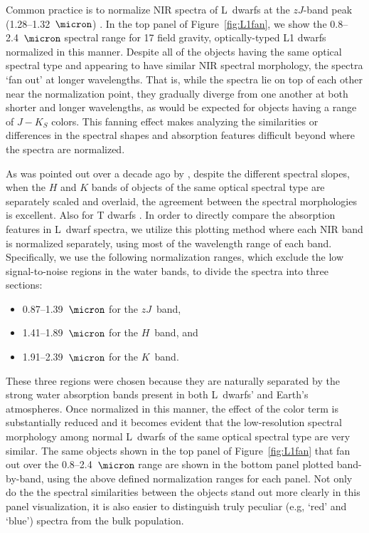 \documentclass[12pt]{aastex6}
\begin{document}
Common practice is to normalize NIR spectra of L~dwarfs at the $zJ$-band peak (1.28--1.32~$\micron$) \citep[e.g.,][]{Kirkpatrick10}.
In the top panel of Figure~\ref{fig:L1fan}, we show the 0.8--2.4~$\micron$ spectral range for 17 field gravity, optically-typed L1 dwarfs normalized in this manner.
Despite all of the objects having the same optical spectral type and appearing to have similar NIR spectral morphology, the spectra `fan out' at longer wavelengths.
That is, while the spectra lie on top of each other near the normalization point, they gradually diverge from one another at both shorter and longer wavelengths, as would be expected for objects having a range of $J-K_S$ colors.
This fanning effect makes analyzing the similarities or differences in the spectral shapes and absorption features difficult beyond where the spectra are normalized.

As was pointed out over a decade ago by \citet{Leggett:2003tm}, despite the different spectral slopes, when the $H$ and $K$ bands of objects of the same optical spectral type are separately scaled and overlaid, the agreement between the spectral morphologies is excellent.
Also for T dwarfs \cite{Burgasser06}.
In order to directly compare the absorption features in L~dwarf spectra, we utilize this plotting method where each NIR band is normalized separately, using most of the wavelength range of each band.
Specifically, we use the following normalization ranges, which exclude the low signal-to-noise regions in the water bands, to divide the spectra into three sections:
\begin{itemize} \itemsep1pt \parskip0pt 
\item 0.87--1.39~$\micron$ for the $zJ$~band,
\item 1.41--1.89~$\micron$ for the $H$~band, and
\item 1.91--2.39~$\micron$ for the $K$~band.
\end{itemize}
These three regions were chosen because they are naturally separated by the strong water absorption bands present in both L~dwarfs' and Earth's atmospheres.
Once normalized in this manner, the effect of the color term is substantially reduced and it becomes evident that the low-resolution spectral morphology among normal L~dwarfs of the same optical spectral type are very similar.
The same objects shown in the top panel of Figure~\ref{fig:L1fan} that fan out over the 0.8--2.4~$\micron$ range are shown in the bottom panel plotted band-by-band, using the above defined normalization ranges for each panel.
Not only do the the spectral similarities between the objects stand out more clearly in this panel visualization, it is also easier to distinguish truly peculiar (e.g, `red' and `blue') spectra from the bulk population.
\end{document}
